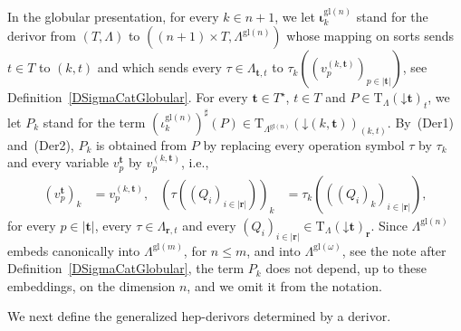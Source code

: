\documentclass[a4paper, reqno
]{amsart}
\newcommand{\bb}[1]{\ensuremath{\lvert #1 \rvert}}
\newcommand{\vs}[1]{\mathbin{\downarrow}#1}
\newcommand{\gl}{\mathrm{gl}}                %
\theoremstyle{plain}
\theoremstyle{definition}
\begin{document}
In the globular presentation, for every $k\in n+1$, we let $\boldsymbol{\iota}^{\gl(n)}_{k}$ stand for the derivor from $(T,\Lambda)$ to $((n+1)\times T,\Lambda^{\gl(n)})$ whose mapping on sorts sends $t\in T$ to $(k,t)$ and which sends every $\tau\in\Lambda_{\mathbf{t},t}$ to $\tau_{k}((v^{(k,\mathbf{t})}_{p})_{p\in\bb{\mathbf{t}}})$, see Definition~\ref{DSigmaCatGlobular}.
For every $\mathbf{t}\in T^{\star}$, $t\in T$ and $P\in\mathrm{T}_{\Lambda}(\vs{\mathbf{t}})_{t}$, we let $P_{k}$ stand for the term $(\iota^{\gl(n)}_{k})^{\sharp}(P)\in\mathrm{T}_{\Lambda^{\gl(n)}}(\vs{(k,\mathbf{t})})_{(k,t)}$.
By~(Der1) and~(Der2), $P_{k}$ is obtained from $P$ by replacing every operation symbol $\tau$ by $\tau_{k}$ and every variable $v^{\mathbf{t}}_{p}$ by $v^{(k,\mathbf{t})}_{p}$, i.e.,
\begin{align*}
\left(v^{\mathbf{t}}_{p}\right)_{k}&=v^{(k,\mathbf{t})}_{p},
&
\left(\tau\left((Q_{i})_{i\in\bb{\mathbf{r}}}\right)\right)_{k}&=\tau_{k}\left(\left((Q_{i})_{k}\right)_{i\in\bb{\mathbf{r}}}\right),
\end{align*}
for every $p\in\bb{\mathbf{t}}$, every $\tau\in\Lambda_{\mathbf{r},t}$ and every $(Q_{i})_{i\in\bb{\mathbf{r}}}\in\mathrm{T}_{\Lambda}(\vs{\mathbf{t}})_{\mathbf{r}}$.
Since $\Lambda^{\gl(n)}$ embeds canonically into $\Lambda^{\gl(m)}$, for $n\leq m$, and into $\Lambda^{\gl(\omega)}$, see the note after Definition~\ref{DSigmaCatGlobular}, the term $P_{k}$ does not depend, up to these embeddings, on the dimension $n$, and we omit it from the notation.

We next define the generalized hep-derivors determined by a derivor.
\end{document}
